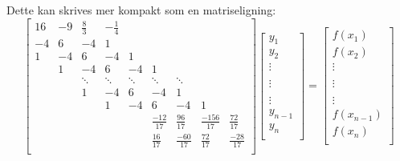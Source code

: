 Dette kan skrives mer kompakt som en matriseligning:
\begin{equation}
\begin{bmatrix}
16	& -9	& \frac{8}{3}	& -\frac{1}{4}	&	&	&	&	&\\
-4	& 6		& -4			& 1				&	&	&	&	&\\
1	& -4	& 6				& -4			& 1	&	&	&	&\\
	& 1		& -4			& 6				&-4	& 1	&	&	&\\
	&  & \ddots		&\ddots			&\ddots	&\ddots	&\ddots	&\\
	&		& 1	& -4	& 6				& -4			& 1	&\\
	&		&	& 1	& -4	& 6				& -4			& 1\\
	&	&	&	&	&\frac{-12}{17}	&\frac{96}{17}	&\frac{-156}{17}	&\frac{72}{17}\\
	&	&	&	&	&\frac{16}{17}	&\frac{-60}{17}	&\frac{72}{17}	&\frac{-28}{17}\\
\end{bmatrix}
\begin{bmatrix}
y_1\\
y_2\\
\vdots\\
\\
\vdots\\
\\
\vdots\\
y_{n-1}\\
y_n\\
\end{bmatrix} =
\begin{bmatrix}
f(x_1)\\
f(x_2)\\
\vdots\\
\\
\vdots\\
\\
\vdots\\
f(x_{n-1})\\
f(x_n)\\
\end{bmatrix}
\end{equation}